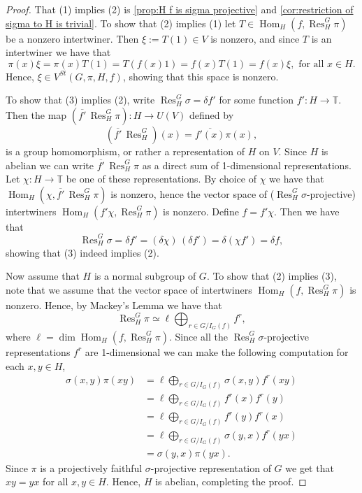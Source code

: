\documentclass[11pt, oneside, reqno]{amsart}
\newcommand{\bbT}{\mathbb{T}}
\newcommand{\Hom}{\operatorname{Hom}}
\newcommand{\Res}{\operatorname{Res}}
\theoremstyle{definition}
\theoremstyle{plain}
\theoremstyle{remark}
\begin{document}
\begin{proof}
    That (1) implies (2) is \cref{prop:H f is sigma projective} and \cref{cor:restriction of sigma to H is trivial}. To show that (2) implies (1) let $T \in \Hom_H(f, \Res^G_H\pi)$ be a nonzero intertwiner. Then $\xi := T(1) \in V$ is nonzero, and since $T$ is an intertwiner we have that
    \begin{equation*}
        \pi(x) \xi 
        = \pi(x) T(1)
        = T (f(x)1)
        = f(x) T(1)
        = f(x) \xi, \text{ for all } x \in H.
    \end{equation*}
    Hence, $\xi \in V^{St}(G,\pi,H,f)$, showing that this space is nonzero.

    To show that (3) implies (2), write $\Res^G_H\sigma = \delta f'$ for some function $f' \colon H \to \bbT$. Then the map $(\overline{f'} \, \Res^G_H\pi) \colon H \to U(V)$ defined by
    \begin{equation*}
        (\overline{f'} \, \Res^G_H)(x) = \overline{f'(x)} \pi(x),
    \end{equation*}
    is a group homomorphism, or rather a representation of $H$ on $V$. Since $H$ is abelian we can write $\overline{f'} \, \Res^G_H\pi$ as a direct sum of 1-dimensional representations. Let $\chi \colon H \to \bbT$ be one of these representations. By choice of $\chi$ we have that $\Hom_H(\chi, \overline{f'} \, \Res^G_H\pi)$ is nonzero, hence the vector space of ($\Res^G_H\sigma$-projective) intertwiners $\Hom_H(f'\chi, \Res^G_H\pi)$ is nonzero. Define $f = f'\chi$. Then we have that
    \begin{equation*}
        \Res^G_H\sigma 
        = \delta f' 
        = (\delta\chi) \, (\delta f')
        = \delta (\chi f')
        = \delta f,
    \end{equation*}
    showing that (3) indeed implies (2).

    Now assume that $H$ is a normal subgroup of $G$. To show that (2) implies (3), note that we assume that the vector space of intertwiners $\Hom_H(f,\Res^G_H\pi)$ is nonzero. Hence, by Mackey's Lemma we have that
    \begin{equation*}
        \Res^G_H\pi \simeq \ell \bigoplus_{r \in G/I_G(f)} f^r,
    \end{equation*}
    where $\ell = \dim \Hom_H(f,\Res^G_H\pi)$. Since all the $\Res^G_H\sigma$-projective representations $f^r$ are 1-dimensional we can make the following computation for each $x,y \in H$,
    \begin{align*}
        \sigma(x,y)\pi(xy) 
        & = \ell \bigoplus_{r \in G/I_G(f)} \sigma(x,y)f^r(xy) \\
        & = \ell \bigoplus_{r \in G/I_G(f)} f^r(x) f^r(y) \\
        & = \ell \bigoplus_{r \in G/I_G(f)} f^r(y) f^r(x) \\
        & = \ell \bigoplus_{r \in G/I_G(f)} \sigma(y,x)f^r(yx) \\
        & = \sigma(y,x)\pi(yx).
    \end{align*}
    Since $\pi$ is a projectively faithful $\sigma$-projective representation of $G$ we get that $xy = yx$ for all $x,y \in H$. Hence, $H$ is abelian, completing the proof.
\end{proof}
\end{document}
